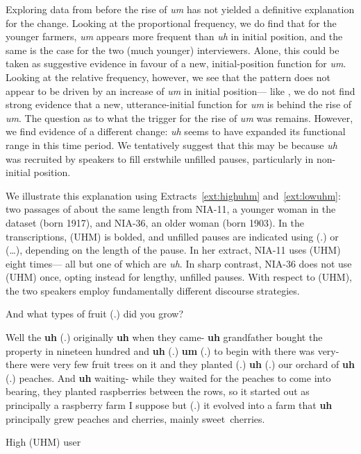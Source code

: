 \documentclass[11pt]{article}
\begin{document}
Exploring data from before the rise of \emph{um} has not yielded a definitive
explanation for the change.
Looking at the proportional frequency, we do find that for the younger
farmers,
\emph{um} appears more frequent than \emph{uh} in initial position, and the same
is the case for the two (much younger) interviewers.
Alone, this could be taken as suggestive evidence in favour of a new,
initial-position function for \emph{um}.
Looking at the relative frequency, however, we see that the pattern does not
appear to be driven by an increase of \emph{um} in initial position---%
like \textcite{fruehwald2016}, we do not find strong evidence that a new,
utterance-initial function for \emph{um} is behind the rise of \emph{um}.
The question as to what the trigger for the rise of \emph{um} was remains.
However, we find evidence of a different change: \emph{uh} seems to have expanded its
functional range in this time period.
We tentatively suggest that this may be because \emph{uh} was recruited by
speakers to fill erstwhile unfilled pauses, particularly in non-initial
position.

We illustrate this explanation using Extracts~\ref{ext:highuhm}
and~\ref{ext:lowuhm}:
two passages of about the same length from NIA-11, a younger woman in the
dataset (born 1917), and NIA-36, an older woman (born 1903).
In the transcriptions, (UHM) is bolded, and unfilled pauses are indicated using
(.) or (\ldots), depending on the length of the pause.
In her extract, NIA-11 uses (UHM) eight times---%
all but one of which are \emph{uh}.
In sharp contrast, NIA-36 does not use (UHM) once, opting instead for lengthy,
unfilled pauses.
With respect to (UHM), the two speakers employ fundamentally different discourse
strategies.

\begin{extract}[ht!]
    \begin{mdframed}[leftmargin=10pt,rightmargin=10pt]
        \begin{dialogue}

             And what types of fruit (.) did you grow?

             Well the \textbf{uh} (.) originally \textbf{uh} when they
            came- \textbf{uh} grandfather bought the property in nineteen hundred
            and \textbf{uh} (.) \textbf{um} (.) to begin with there was very- there
            were very few fruit trees on it and they planted (.) \textbf{uh} (.) our
            orchard of \textbf{uh} (.)  peaches. And \textbf{uh} waiting- while they
            waited for the peaches to come into bearing, they planted raspberries
            between the rows, so it started out as principally a raspberry farm I
            suppose but (.) it evolved into a farm that \textbf{uh} principally grew
            peaches and cherries, mainly sweet~cherries.
        \end{dialogue}
    \end{mdframed}
    \caption{High (UHM) user}\label{ext:highuhm}
\end{extract}
\end{document}
